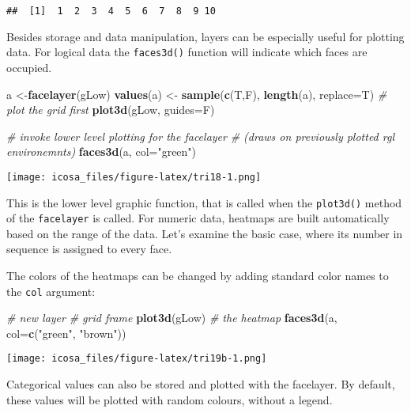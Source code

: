 \documentclass[]{article}
\newenvironment{Shaded}{\begin{snugshade}}{\end{snugshade}}
\newcommand{\KeywordTok}[1]{\textcolor[rgb]{0.13,0.29,0.53}{\textbf{#1}}}
\newcommand{\DataTypeTok}[1]{\textcolor[rgb]{0.13,0.29,0.53}{#1}}
\newcommand{\StringTok}[1]{\textcolor[rgb]{0.31,0.60,0.02}{#1}}
\newcommand{\CommentTok}[1]{\textcolor[rgb]{0.56,0.35,0.01}{\textit{#1}}}
\newcommand{\NormalTok}[1]{#1}
\begin{document}
\begin{verbatim}
##  [1]  1  2  3  4  5  6  7  8  9 10
\end{verbatim}

Besides storage and data manipulation, layers can be especially useful
for plotting data. For logical data the \texttt{faces3d()} function will
indicate which faces are occupied.

\begin{Shaded}
\begin{Highlighting}[]
\NormalTok{a <-}\KeywordTok{facelayer}\NormalTok{(gLow)}
\KeywordTok{values}\NormalTok{(a) <-}\StringTok{ }\KeywordTok{sample}\NormalTok{(}\KeywordTok{c}\NormalTok{(T,F), }\KeywordTok{length}\NormalTok{(a), }\DataTypeTok{replace=}\NormalTok{T)}
\CommentTok{# plot the grid first}
\KeywordTok{plot3d}\NormalTok{(gLow, }\DataTypeTok{guides=}\NormalTok{F)}

\CommentTok{# invoke lower level plotting for the facelayer }
\CommentTok{# (draws on previously plotted rgl environemnts)}
\KeywordTok{faces3d}\NormalTok{(a, }\DataTypeTok{col=}\StringTok{"green"}\NormalTok{)}
\end{Highlighting}
\end{Shaded}

\texttt{[image: icosa\_files/figure-latex/tri18-1.png]}

This is the lower level graphic function, that is called when the
\texttt{plot3d()} method of the \texttt{facelayer} is called. For
numeric data, heatmaps are built automatically based on the range of the
data. Let's examine the basic case, where its number in sequence is
assigned to every face.

The colors of the heatmaps can be changed by adding standard color names
to the \texttt{col} argument:

\begin{Shaded}
\begin{Highlighting}[]
\CommentTok{# new layer}
\CommentTok{# grid frame}
\KeywordTok{plot3d}\NormalTok{(gLow)}
\CommentTok{# the heatmap}
\KeywordTok{faces3d}\NormalTok{(a, }\DataTypeTok{col=}\KeywordTok{c}\NormalTok{(}\StringTok{"green"}\NormalTok{, }\StringTok{"brown"}\NormalTok{)) }
\end{Highlighting}
\end{Shaded}

\texttt{[image: icosa\_files/figure-latex/tri19b-1.png]}

Categorical values can also be stored and plotted with the facelayer. By
default, these values will be plotted with random colours, without a
legend.
\end{document}
